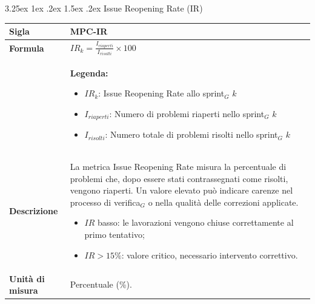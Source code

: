 \documentclass[a4paper, 10pt]{article}
\makeatletter
\renewcommand\paragraph{\@startsection{paragraph}{4}{\z@}%
  {3.25ex \@plus1ex \@minus .2ex}%
  {1.5ex \@plus .2ex}%
  {\normalfont\normalsize\bfseries}}
\makeatother
\begin{document}
\paragraph{Issue Reopening Rate (IR)}
\mbox{} \\
\noindent
\begin{minipage}{\textwidth}
    \begin{tabularx}{\textwidth}{|>{\columncolor{bluBitless!10}\bfseries}p{3.5cm}|X|}
        \hline
        Sigla & MPC-IR \\ \hline
        Formula &
        \textit{$IR_{k} = \frac{I_{riaperti}}{I_{risolti}} \times 100$} \vspace{2mm} \\
        & \small \textbf{Legenda:}
        \begin{itemize}
            \item $IR_{k}$: Issue Reopening Rate allo sprint$_G$ $k$
            \item $I_{riaperti}$: Numero di problemi riaperti nello sprint$_G$ $k$
            \item $I_{risolti}$: Numero totale di problemi risolti nello sprint$_G$ $k$
        \end{itemize} \\ \hline
        Descrizione & La metrica Issue Reopening Rate misura la percentuale di problemi che, dopo essere stati contrassegnati come risolti, vengono riaperti. Un valore elevato può indicare carenze nel processo di verifica$_G$ o nella qualità delle correzioni applicate.
        \begin{itemize}
            \item $IR$ basso: le lavorazioni vengono chiuse correttamente al primo tentativo;
            \item $IR > 15\%$: valore critico, necessario intervento correttivo.
        \end{itemize} \\ \hline
        Unità di misura & Percentuale (\%). \\ \hline
    \end{tabularx}
\end{minipage}

\vspace{1cm}

\end{document}
